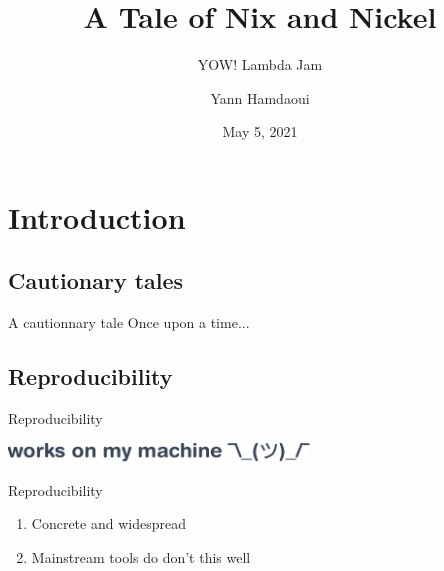 \documentclass[a4paper]{beamer}
\author{Yann Hamdaoui}
\title{A Tale of Nix and Nickel}
\subtitle{YOW! Lambda Jam}
\date{May 5, 2021}
\begin{document}

\newenvironment{frcseries}{\fontfamily{frc}\selectfont}{}
\newcommand{\textfrc}[1]{{\frcseries#1}}

\begin{frame}
\titlepage
\end{frame}

\section{Introduction}

\subsection{Cautionary tales}

\begin{frame}{A cautionnary tale}
Once upon a time...
\end{frame}

\subsection{Reproducibility}

\begin{frame}{Reproducibility}
    \begin{center}
        \includegraphics[width=0.6\textwidth]{img/works-on-my-machine.pdf}
    \end{center}

    \vspace{10pt}

     {
    \begin{alertblock}{Reproducibility}
    \begin{enumerate}
        \item<3-> Concrete and widespread
        \item<4-> Mainstream tools do don't this well
    \end{enumerate}
    \end{alertblock}
}
\end{frame}
\end{document}
